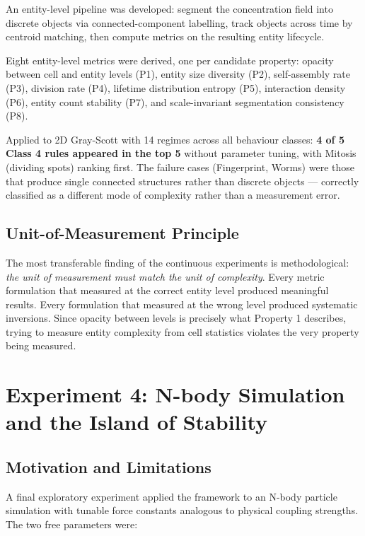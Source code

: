 \documentclass[12pt,a4paper]{article}
\begin{document}
An entity-level pipeline was developed: segment the concentration field
into discrete objects via connected-component labelling, track objects
across time by centroid matching, then compute metrics on the resulting
entity lifecycle.

Eight entity-level metrics were derived, one per candidate property:
opacity between cell and entity levels (P1), entity size diversity (P2),
self-assembly rate (P3), division rate (P4), lifetime distribution
entropy (P5), interaction density (P6), entity count stability (P7),
and scale-invariant segmentation consistency (P8).

Applied to 2D Gray-Scott with 14 regimes across all behaviour classes:
\textbf{4 of 5 Class 4 rules appeared in the top 5} without parameter
tuning, with Mitosis (dividing spots) ranking first.
The failure cases (Fingerprint, Worms) were those that produce single
connected structures rather than discrete objects — correctly classified
as a different mode of complexity rather than a measurement error.

\subsection{Unit-of-Measurement Principle}

The most transferable finding of the continuous experiments is
methodological: \emph{the unit of measurement must match the unit of
complexity}.
Every metric formulation that measured at the correct entity level
produced meaningful results.
Every formulation that measured at the wrong level produced systematic
inversions.
Since opacity between levels is precisely what Property 1 describes,
trying to measure entity complexity from cell statistics violates the
very property being measured.

\section{Experiment 4: N-body Simulation and the Island of Stability}

\subsection{Motivation and Limitations}

A final exploratory experiment applied the framework to an N-body
particle simulation with tunable force constants analogous to physical
coupling strengths.
The two free parameters were:
\end{document}

